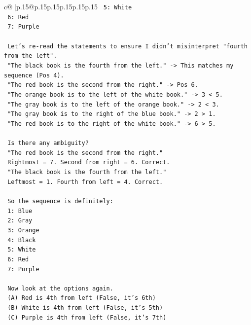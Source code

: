 \documentclass{article}
\begin{document}
{\begin{supertabular}{c@{$\;$}|p{.15\linewidth}@{}p{.15\linewidth}p{.15\linewidth}p{.15\linewidth}p{.15\linewidth}p{.15\linewidth}}
{{{\texttt{    5: White} \\
\texttt{    6: Red} \\
\texttt{    7: Purple} \\
\\ 
\texttt{    Let's re{-}read the statements to ensure I didn't misinterpret "fourth from the left".} \\
\texttt{    "The black book is the fourth from the left." {-}> This matches my sequence (Pos 4).} \\
\texttt{    "The red book is the second from the right." {-}> Pos 6.} \\
\texttt{    "The orange book is to the left of the white book." {-}> 3 < 5.} \\
\texttt{    "The gray book is to the left of the orange book." {-}> 2 < 3.} \\
\texttt{    "The gray book is to the right of the blue book." {-}> 2 > 1.} \\
\texttt{    "The red book is to the right of the white book." {-}> 6 > 5.} \\
\\ 
\texttt{    Is there any ambiguity?} \\
\texttt{    "The red book is the second from the right."} \\
\texttt{    Rightmost = 7. Second from right = 6. Correct.} \\
\texttt{    "The black book is the fourth from the left."} \\
\texttt{    Leftmost = 1. Fourth from left = 4. Correct.} \\
\\ 
\texttt{    So the sequence is definitely:} \\
\texttt{    1: Blue} \\
\texttt{    2: Gray} \\
\texttt{    3: Orange} \\
\texttt{    4: Black} \\
\texttt{    5: White} \\
\texttt{    6: Red} \\
\texttt{    7: Purple} \\
\\ 
\texttt{    Now look at the options again.} \\
\texttt{    (A) Red is 4th from left (False, it's 6th)} \\
\texttt{    (B) White is 4th from left (False, it's 5th)} \\
\texttt{    (C) Purple is 4th from left (False, it's 7th)} \\
}}}
\end{supertabular}}
\end{document}
